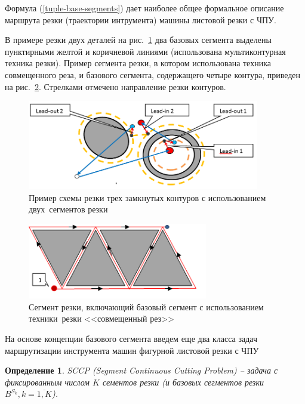 \documentclass[11pt,twoside,openany]{report}
\newcounter{lem}
\newcounter{theo}
\newcounter{pred}
\newcounter{opred}
\newtheorem{opred}{Определение}[section]
\begin{document}
Формула (\ref{tuple-base-segments})
дает наиболее общее формальное описание маршрута резки (траектории интрумента)
машины листовой резки с ЧПУ.

В примере резки двух деталей
на рис.~\ref{cut2-1}
два базовых сегмента выделены пунктирными
желтой и коричневой линиями
(использована мультиконтурная техника резки).
Пример сегмента резки, в котором использована техника совмещенного реза,
и базового сегмента, содержащего четыре контура,
приведен на рис.~\ref{cut4-3}.
Стрелками отмечено направление резки контуров.

\begin{figure}[h]
  \begin{center}
  \includegraphics[width=0.9\textwidth]{cut2-1.png}
  \caption{
    Пример схемы резки трех замкнутых контуров
    с использованием двух~сегментов резки
    }
  \label{cut2-1}
  \end{center}
\end{figure}

\begin{figure}[h]
  \begin{center}
  \includegraphics[width=0.7\textwidth]{cut4-3.png}
  \caption{
    Сегмент резки, включающий базовый сегмент
    с использованием техники~резки <<совмещенный рез>>
    }
  \label{cut4-3}
  \end{center}
\end{figure}

На основе концепции базового сегмента введем еще
два класса задач маршрутизации инструмента машин
фигурной листовой резки с ЧПУ

\begin{opred}
  \label{def:SCCP}
  {\it SCCP (Segment Continuous Cutting Problem)}
  --
  задача с фиксированным числом $K$
  сементов резки
  (и базовых сегментов резки
  $B^{S_k}, k = \overline{1, K}$).
\end{opred}
\end{document}
